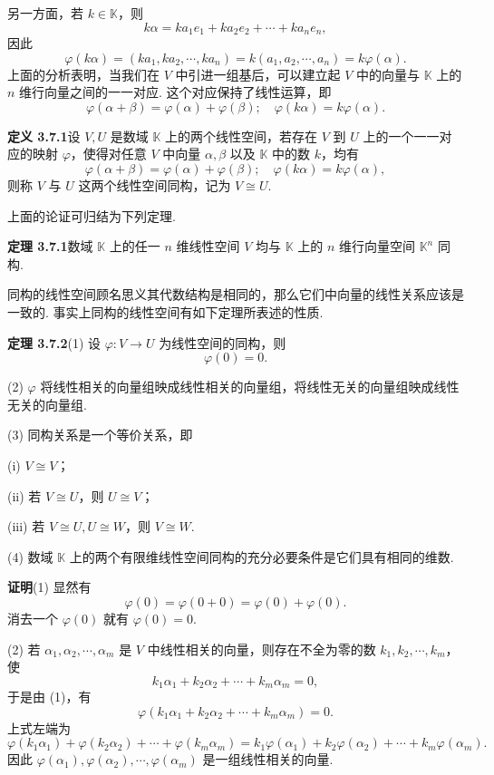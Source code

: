 \documentclass[UTF8,12pt,a4paper,fontset=fandol]{ctexart}
\begin{document}
另一方面，若 $k\in\mathbb{K}$，则
\[
k\alpha=ka_1e_1+ka_2e_2+\cdots+ka_ne_n,
\]
因此
\[
\varphi(k\alpha)=(ka_1,ka_2,\cdots,ka_n)=k(a_1,a_2,\cdots,a_n)=k\varphi(\alpha).
\]
上面的分析表明，当我们在 $V$ 中引进一组基后，可以建立起 $V$ 中的向量与 $\mathbb{K}$ 上的 $n$ 维行向量之间的一一对应. 这个对应保持了线性运算，即
\[
\varphi(\alpha+\beta)=\varphi(\alpha)+\varphi(\beta);\quad \varphi(k\alpha)=k\varphi(\alpha).
\]

\noindent\textbf{定义 3.7.1}\quad 设 $V,U$ 是数域 $\mathbb{K}$ 上的两个线性空间，若存在 $V$ 到 $U$ 上的一个一一对应的映射 $\varphi$，使得对任意 $V$ 中向量 $\alpha,\beta$ 以及 $\mathbb{K}$ 中的数 $k$，均有
\[
\varphi(\alpha+\beta)=\varphi(\alpha)+\varphi(\beta);\quad \varphi(k\alpha)=k\varphi(\alpha),
\]
则称 $V$ 与 $U$ 这两个线性空间同构，记为 $V\cong U$.

上面的论证可归结为下列定理.

\noindent\textbf{定理 3.7.1}\quad 数域 $\mathbb{K}$ 上的任一 $n$ 维线性空间 $V$ 均与 $\mathbb{K}$ 上的 $n$ 维行向量空间 $\mathbb{K}^n$ 同构.

同构的线性空间顾名思义其代数结构是相同的，那么它们中向量的线性关系应该是一致的. 事实上同构的线性空间有如下定理所表述的性质.

\noindent\textbf{定理 3.7.2}\quad (1) 设 $\varphi:V\to U$ 为线性空间的同构，则
\[
\varphi(0)=0.
\]

(2) $\varphi$ 将线性相关的向量组映成线性相关的向量组，将线性无关的向量组映成线性无关的向量组.

(3) 同构关系是一个等价关系，即

(i) $V\cong V$；

(ii) 若 $V\cong U$，则 $U\cong V$；

(iii) 若 $V\cong U,U\cong W$，则 $V\cong W$.

(4) 数域 $\mathbb{K}$ 上的两个有限维线性空间同构的充分必要条件是它们具有相同的维数.

\noindent\textbf{证明}\quad (1) 显然有
\[
\varphi(0)=\varphi(0+0)=\varphi(0)+\varphi(0).
\]
消去一个 $\varphi(0)$ 就有 $\varphi(0)=0$.

(2) 若 $\alpha_1,\alpha_2,\cdots,\alpha_m$ 是 $V$ 中线性相关的向量，则存在不全为零的数 $k_1,k_2,\cdots,k_m$，使
\[
k_1\alpha_1+k_2\alpha_2+\cdots+k_m\alpha_m=0,
\]
于是由 (1)，有
\[
\varphi(k_1\alpha_1+k_2\alpha_2+\cdots+k_m\alpha_m)=0.
\]
上式左端为
\[
\varphi(k_1\alpha_1)+\varphi(k_2\alpha_2)+\cdots+\varphi(k_m\alpha_m)=k_1\varphi(\alpha_1)+k_2\varphi(\alpha_2)+\cdots+k_m\varphi(\alpha_m).
\]
因此 $\varphi(\alpha_1),\varphi(\alpha_2),\cdots,\varphi(\alpha_m)$ 是一组线性相关的向量.
\end{document}
